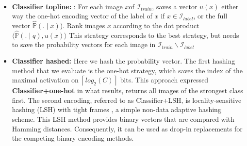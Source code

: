 \documentclass{article}
\begin{document}
\\
\begin{itemize}

\item \textbf{Classifier topline: }: For each image $x$of $\mathcal{I}_{train}$, saves a vector $u(x)$ either way \cite{norouzi2012hamming} the one-hot encoding vector of the label of $x$ if $x \in \mathcal{I}_{label}$, or \cite{wang2013learning} the full vector  $\hat{\mathbb{P}}(.\mid x)$). Rank images $x$ according to the dot product $\langle\hat{\mathbb{P}}(.\mid q), u(x)\rangle$  This strategy corresponds to the best strategy, but needs to save the probability vectors for each image in $\mathcal{I}_{train} \backslash \mathcal{I}_{label}$


\item \textbf{Classifier hashed: } Here we hash the probability vector. The first hashing method that we evaluate is the one-hot strategy, which saves the index of the maximal activation on $\left \lceil log_2(C) \right \rceil$ bits. This approach expressed \textbf{Classifier+one-hot} in what results, returns all images of the strongest class first. The second encoding, referred to as Classifier+LSH, is locality-sensitive hashing (LSH) with tight frames \cite{jegou2012anti}, a simple non-data adaptive hashing scheme. This LSH method provides binary vectors that are compared with Hamming distances. Consequently, it can be used as drop-in replacements for the competing binary encoding methods.
\end{itemize}
\end{document}

